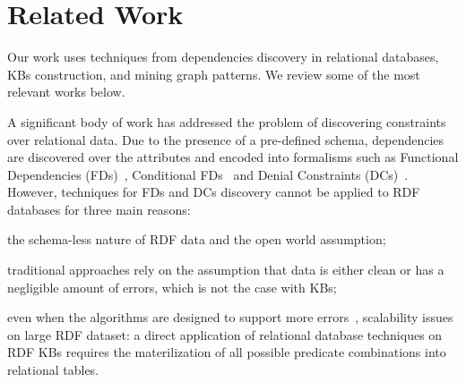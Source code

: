 \section{Related Work} \label{sec:krd_related}

Our work %
uses techniques from dependencies discovery in relational databases, KBs construction, and mining graph patterns. 
We review some of the most relevant works below.

A significant body of work has addressed the problem of discovering constraints over relational data. 
Due to the presence of a pre-defined schema, dependencies are discovered over the attributes and encoded into formalisms such as 
Functional Dependencies (FDs)~\cite{abiteboul1995foundations,huhtala1999tane,wyss2001fastfds}, Conditional FDs~\cite{fan2011discovering} 
and Denial Constraints (DCs)~\cite{chu2013discovering}. 
%
%
However, techniques for FDs and DCs discovery cannot be applied to RDF databases for three main reasons:
\begin{inparaenum}[\itshape(i)]
	\item the schema-less nature of RDF data and the open world assumption; %
	\item traditional approaches rely on the assumption that data is either clean or has a negligible amount of errors, which is not the case with KBs;
	\item even when the algorithms are designed to support more errors~\cite{abedjan2015temporal,kivinen1995approximate}, scalability issues on large RDF dataset: a direct application of relational database techniques on RDF KBs requires the materilization of all possible predicate combinations into relational tables.
\end{inparaenum}

